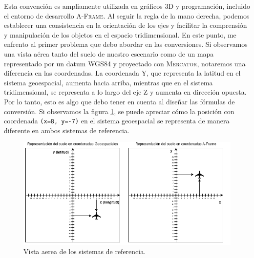 \documentclass[a4paper, 11pt]{book}
\begin{document}
Esta convención es ampliamente utilizada en gráficos \textsc{3D} y programación, incluido el entorno de desarrollo \textsc{A-Frame}. Al seguir la regla de la mano derecha, podemos establecer una consistencia en la orientación de los ejes y facilitar la comprensión y manipulación de los objetos en el espacio tridimensional.
En este punto, me enfrento al primer problema que debo abordar en las conversiones. Si observamos una vista aérea tanto del suelo de nuestro escenario como de un mapa representado por un \gls{datum} \textsc{WGS84} y proyectado con \textsc{Mercator}, notaremos una diferencia en las coordenadas.
La coordenada \textsc{Y}, que representa la latitud en el sistema \gls{geoespacial}, aumenta hacia arriba, mientras que en el sistema tridimensional, se representa a lo largo del eje \textsc{Z} y aumenta en dirección opuesta. Por lo tanto, esto es algo que debo tener en cuenta al diseñar las fórmulas de conversión.
Si observamos la figura \ref{fig:sistemasDeReferencia}, se puede apreciar cómo la posición con coordenada \texttt{(x=8, y=-7)} en el sistema \gls{geoespacial} se representa de manera diferente en ambos sistemas de referencia.
\begin{figure}[H]
  \centering
  \includegraphics[width=13cm, keepaspectratio]{img/sistemasDeReferencia.drawio.png}
  \caption{Vista aerea de los sistemas de referencia.}
  \label{fig:sistemasDeReferencia}
\end{figure}
\end{document}
